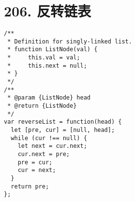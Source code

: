 \newpage
\section{206. 反转链表}
\label{leetcode:206}

\begin{verbatim}
/**
 * Definition for singly-linked list.
 * function ListNode(val) {
 *     this.val = val;
 *     this.next = null;
 * }
 */
/**
 * @param {ListNode} head
 * @return {ListNode}
 */
var reverseList = function(head) {
  let [pre, cur] = [null, head];
  while (cur !== null) {
    let next = cur.next;
    cur.next = pre;
    pre = cur;
    cur = next;
  }
  return pre;
};
\end{verbatim}
